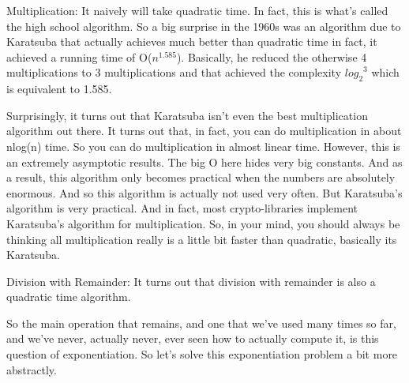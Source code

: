 \documentclass[11pt]{article}
\begin{document}
Multiplication: It naively will take quadratic time. In fact, this is
what's called the high school algorithm. So a big surprise in the 1960s
was an algorithm due to Karatsuba that actually achieves much better
than quadratic time in fact, it achieved a running time of
O(\(n^{1.585}\)). Basically, he reduced the otherwise 4 multiplications
to 3 multiplications and that achieved the complexity \({log_{2}}^{3}\)
which is equivalent to 1.585.

Surprisingly, it turns out that Karatsuba isn't even the best
multiplication algorithm out there. It turns out that, in fact, you can
do multiplication in about nlog(n) time. So you can do multiplication in
almost linear time. However, this is an extremely asymptotic results.
The big O here hides very big constants. And as a result, this algorithm
only becomes practical when the numbers are absolutely enormous. And so
this algorithm is actually not used very often. But Karatsuba's
algorithm is very practical. And in fact, most crypto-libraries
implement Karatsuba's algorithm for multiplication. So, in your mind,
you should always be thinking all multiplication really is a little bit
faster than quadratic, basically its Karatsuba.

Division with Remainder: It turns out that division with remainder is
also a quadratic time algorithm.

So the main operation that remains, and one that we've used many times
so far, and we've never, actually never, ever seen how to actually
compute it, is this question of exponentiation. So let's solve this
exponentiation problem a bit more abstractly.
\end{document}
